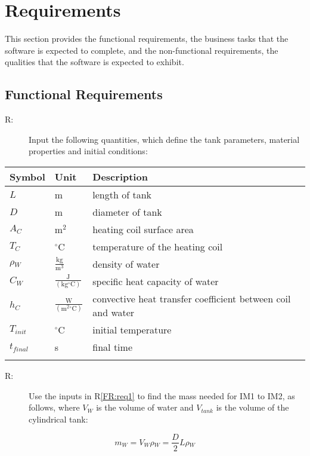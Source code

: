 \documentclass[12pt]{article}
\newcounter{reqnum}
\newcommand{\rthereqnum}{R\thereqnum}
\begin{document}
\section{Requirements}
\label{Sec:Requirements}
This section provides the functional requirements, the business tasks that the software is expected to complete, and the non-functional requirements, the qualities that the software is expected to exhibit.
\subsection{Functional Requirements}
\label{Sec:FRs}
\begin{description}
\item[\rthereqnum\label{FR:req1}:]Input the following quantities, which define the tank parameters, material properties and initial conditions:
\end{description}
\begin{longtabu}{l l X[l]}
\toprule
Symbol & Unit & Description
\\
\midrule
$L$ & m & length of tank
\\
$D$ & m & diameter of tank
\\
${A_{C}}$ & $\text{m}^{2}$ & heating coil surface area
\\
${T_{C}}$ & ${}^{\circ}$C & temperature of the heating coil
\\
${\rho{}_{W}}$ & $\frac{\text{kg}}{\text{m}^{3}}$ & density of water
\\
${C_{W}}$ & $\frac{\text{J}}{(\text{kg}{}^{\circ}\text{C})}$ & specific heat capacity of water
\\
${h_{C}}$ & $\frac{\text{W}}{(\text{m}^{2}{}^{\circ}\text{C})}$ & convective heat transfer coefficient between coil and water
\\
${T_{init}}$ & ${}^{\circ}$C & initial temperature
\\
${t_{final}}$ & s & final time
\\
\bottomrule
\label{Table:fr1list}
\end{longtabu}
\begin{description}
\item[\rthereqnum\label{FR:req2}:]Use the inputs in R\ref{FR:req1} to find the mass needed for IM1 to IM2, as follows, where ${V_{W}}$ is the volume of water and ${V_{tank}}$ is the volume of the cylindrical tank:
\end{description}
\begin{dmath}
{m_{W}}={V_{W}} {\rho{}_{W}}=\frac{D}{2} L {\rho{}_{W}}
\end{dmath}
\end{document}

